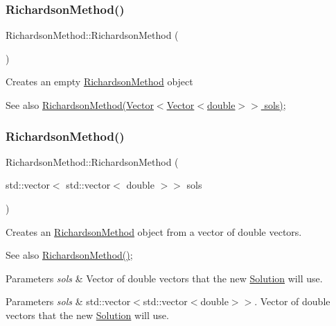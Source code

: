 \subsubsection{\texorpdfstring{Richardson\+Method()}{RichardsonMethod()}\hspace{0.1cm}{\footnotesize\ttfamily [1/2]}}
{\footnotesize\ttfamily Richardson\+Method\+::\+Richardson\+Method (\begin{DoxyParamCaption}{ }\end{DoxyParamCaption})}

Creates an empty \hyperlink{class_richardson_method}{Richardson\+Method} object \begin{DoxySeeAlso}{See also}
\hyperlink{class_richardson_method}{Richardson\+Method(\+Vector$<$\+Vector$<$double$>$$>$ sols)}; 
\end{DoxySeeAlso}
\mbox{\label{class_richardson_method_a11cf699f84bdd051e16983096c6d4979}} 
\subsubsection{\texorpdfstring{Richardson\+Method()}{RichardsonMethod()}\hspace{0.1cm}{\footnotesize\ttfamily [2/2]}}
{\footnotesize\ttfamily Richardson\+Method\+::\+Richardson\+Method (\begin{DoxyParamCaption}\item[{std\+::vector$<$ std\+::vector$<$ double $>$$>$}]{sols }\end{DoxyParamCaption})}

Creates an \hyperlink{class_richardson_method}{Richardson\+Method} object from a vector of double vectors. \begin{DoxySeeAlso}{See also}
\hyperlink{class_richardson_method_a01c839ad5a09cd0e0a9e56ad8e43f980}{Richardson\+Method()}; 
\end{DoxySeeAlso}

\begin{DoxyParams}{Parameters}
{\em sols} & Vector of double vectors that the new \hyperlink{class_solution}{Solution} will use. \\
\hline
\end{DoxyParams}

\begin{DoxyParams}{Parameters}
{\em sols} & std\+::vector$<$std\+::vector$<$double$>$$>$. Vector of double vectors that the new \hyperlink{class_solution}{Solution} will use. \\
\hline
\end{DoxyParams}


